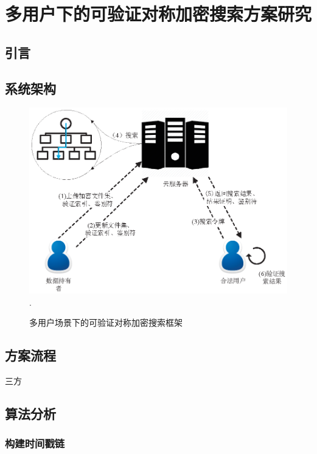 \chapter{多用户下的可验证对称加密搜索方案研究}
\label{cha:multi-user}
\section{引言}

\section{系统架构}

\begin{figure}[t]
\centering
\includegraphics[width=6 in]{fig/GM-VSSE}
\DeclareGraphicsExtensions.
\caption{多用户场景下的可验证对称加密搜索框架\multi}
\label{fig:GM-VSSE}
\end{figure}


\section{方案流程} 三方

\section{算法分析}
\subsection{构建时间戳链}


